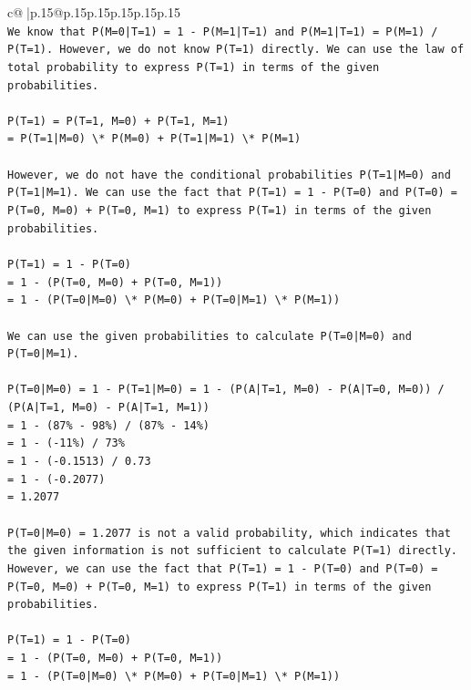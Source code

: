 \documentclass{article}
\begin{document}
{\begin{supertabular}{c@{$\;$}|p{.15\linewidth}@{}p{.15\linewidth}p{.15\linewidth}p{.15\linewidth}p{.15\linewidth}p{.15\linewidth}}
{{{\\ 
\texttt{We know that P(M=0|T=1) = 1 {-} P(M=1|T=1) and P(M=1|T=1) = P(M=1) / P(T=1). However, we do not know P(T=1) directly. We can use the law of total probability to express P(T=1) in terms of the given probabilities.} \\
\\ 
\texttt{P(T=1) = P(T=1, M=0) + P(T=1, M=1)} \\
\texttt{= P(T=1|M=0) \textbackslash{}* P(M=0) + P(T=1|M=1) \textbackslash{}* P(M=1)} \\
\\ 
\texttt{However, we do not have the conditional probabilities P(T=1|M=0) and P(T=1|M=1). We can use the fact that P(T=1) = 1 {-} P(T=0) and P(T=0) = P(T=0, M=0) + P(T=0, M=1) to express P(T=1) in terms of the given probabilities.} \\
\\ 
\texttt{P(T=1) = 1 {-} P(T=0)} \\
\texttt{= 1 {-} (P(T=0, M=0) + P(T=0, M=1))} \\
\texttt{= 1 {-} (P(T=0|M=0) \textbackslash{}* P(M=0) + P(T=0|M=1) \textbackslash{}* P(M=1))} \\
\\ 
\texttt{We can use the given probabilities to calculate P(T=0|M=0) and P(T=0|M=1).} \\
\\ 
\texttt{P(T=0|M=0) = 1 {-} P(T=1|M=0) = 1 {-} (P(A|T=1, M=0) {-} P(A|T=0, M=0)) / (P(A|T=1, M=0) {-} P(A|T=1, M=1))} \\
\texttt{= 1 {-} (87\% {-} 98\%) / (87\% {-} 14\%)} \\
\texttt{= 1 {-} ({-}11\%) / 73\%} \\
\texttt{= 1 {-} ({-}0.1513) / 0.73} \\
\texttt{= 1 {-} ({-}0.2077)} \\
\texttt{= 1.2077} \\
\\ 
\texttt{P(T=0|M=0) = 1.2077 is not a valid probability, which indicates that the given information is not sufficient to calculate P(T=1) directly. However, we can use the fact that P(T=1) = 1 {-} P(T=0) and P(T=0) = P(T=0, M=0) + P(T=0, M=1) to express P(T=1) in terms of the given probabilities.} \\
\\ 
\texttt{P(T=1) = 1 {-} P(T=0)} \\
\texttt{= 1 {-} (P(T=0, M=0) + P(T=0, M=1))} \\
\texttt{= 1 {-} (P(T=0|M=0) \textbackslash{}* P(M=0) + P(T=0|M=1) \textbackslash{}* P(M=1))} \\
}}}
\end{supertabular}}
\end{document}
